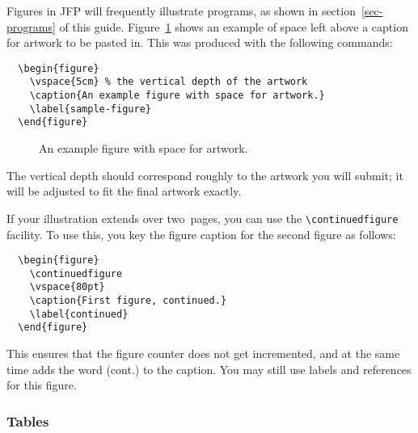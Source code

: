 \documentclass{jfp1}
\begin{document}
Figures in JFP will frequently illustrate programs, as shown in
section~\ref{sec-programs} of this guide. Figure~\ref{sample-figure}
shows an example of space left above a caption for artwork to be pasted in.
This was produced with the following commands:
%
\begin{verbatim}
  \begin{figure}
    \vspace{5cm} % the vertical depth of the artwork
    \caption{An example figure with space for artwork.}
    \label{sample-figure}
  \end{figure}
\end{verbatim}
%
\begin{figure}
  \vspace{5cm} %
  \caption{An example figure with space for artwork.}
  \label{sample-figure}
\end{figure}
%
The vertical depth should correspond roughly to the artwork you will submit;
it will be adjusted to fit the final artwork exactly.

If your illustration extends over two~pages, you can use the
\verb"\continuedfigure" facility. To use this, you key the figure
caption for the second figure as follows:
%
\begin{verbatim}
  \begin{figure}
    \continuedfigure
    \vspace{80pt}
    \caption{First figure, continued.}
    \label{continued}
  \end{figure}
\end{verbatim}
%
This ensures that the figure counter does not get incremented, and at the
same time adds the word (cont.) to the caption. You may still use labels
and references for this figure.

\subsubsection{Tables}
\end{document}
